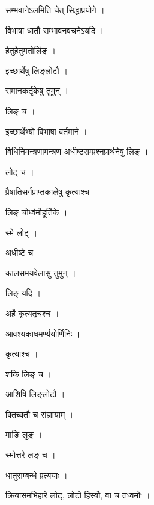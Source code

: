 \documentclass[10pt, openany]{book}
\begin{document}
\noindent सम्भवानेऽलमिति चेत् सिद्धाप्रयोगे ।

\noindent विभाषा धातौ सम्भावनवचनेऽयदि ।

\noindent हेतुहेतुमतोर्लिङ् ।

\noindent इच्छार्थेषु लिङ्लोटौ ।

\noindent समानकर्तृकेषु तुमुन् ।

\noindent लिङ् च ।

\noindent इच्छार्थेभ्यो विभाषा वर्तमाने ।

\noindent विधिनिमन्त्रणामन्त्रण अधीष्टसम्प्रश्नप्रार्थनेषु लिङ् ।

\noindent लोट् च ।

\noindent प्रैषातिसर्गप्राप्तकालेषु कृत्याश्च ।

\noindent लिङ् चोर्ध्वमौहूर्तिके ।

\noindent स्मे लोट् ।

\noindent अधीष्टे च ।

\noindent कालसमयवेलासु तुमुन् ।

\noindent लिङ् यदि ।

\noindent अर्हे कृत्यतृचश्च ।

\noindent आवश्यकाधमर्ण्ययोर्णिनिः ।

\noindent कृत्याश्च ।

\noindent शकि लिङ् च ।

\noindent आशिषि लिङ्लोटौ ।

\noindent क्तिच्क्तौ च संज्ञायाम् ।

\noindent माङि लुङ् ।

\noindent स्मोत्तरे लङ् च ।

\noindent धातुसम्बन्धे प्रत्ययाः ।

\noindent क्रियासमभिहारे लोट्, लोटो हिस्वौ, वा च तध्वमोः ।
\end{document}
